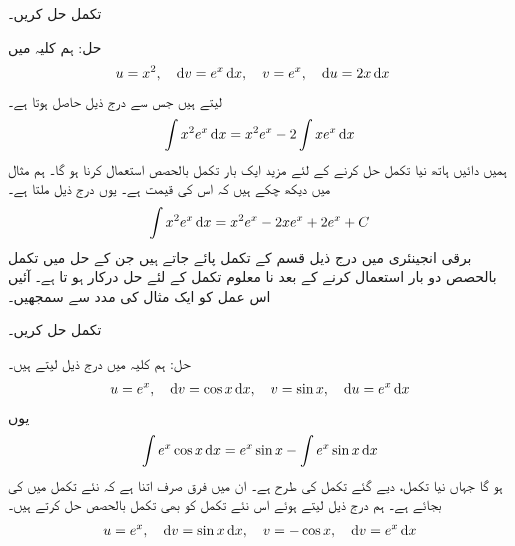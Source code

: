 تکمل  حل کریں۔ 

حل:\quad
ہم کلیہ  میں
\begin{align*}
u&=x^2,\quad \dif v=e^x\dif x,\quad v=e^x,\quad \dif u=2x\dif x
\end{align*}
لیتے ہیں جس سے درج ذیل حاصل ہوتا ہے۔
\begin{align*}
\int x^2e^x\dif x=x^2e^x-2\int xe^x\dif x
\end{align*} 
ہمیں دائیں ہاتھ نیا تکمل حل کرنے کے لئے مزید ایک بار تکمل بالحصص استعمال کرنا ہو گا۔ ہم مثال  میں دیکھ چکے ہیں کہ اس کی قیمت  ہے۔ یوں درج ذیل ملتا ہے۔
\begin{align*}
\int x^2e^x\dif x=x^2e^x-2xe^x+2e^x+C
\end{align*}
برقی انجینئری میں درج ذیل قسم کے تکمل پائے جاتے ہیں جن کے حل میں تکمل بالحصص دو بار استعمال کرنے کے بعد نا معلوم تکمل کے لئے حل درکار ہو تا ہے۔ آئیں اس عمل کو ایک مثال کی مدد سے سمجھیں۔

تکمل  حل کریں۔

حل:\quad
ہم کلیہ  میں درج ذیل لیتے ہیں۔
\begin{align*}
u=e^x,\quad \dif v=\cos x\dif x,\quad v=\sin x,\quad \dif u=e^x\dif x
\end{align*}
یوں
\begin{align*}
\int e^x\cos x\dif x=e^x\sin x-\int e^x\sin x\dif x
\end{align*}
ہو گا جہاں نیا تکمل، دیے گئے تکمل کی طرح ہے۔ ان میں فرق صرف اتنا ہے کہ نئے تکمل میں  کی بجائے  ہے۔ ہم درج ذیل لیتے ہوئے اس نئے تکمل کو بھی تکمل بالحصص حل کرتے ہیں۔
\begin{align*}
u=e^x,\quad \dif v=\sin x\dif x,\quad v=-\cos x,\quad \dif v=e^x\dif x
\end{align*}

